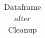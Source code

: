 \begin{table}[H]
\begin{tabular}{l|rrrr}
%
    \end{tabular}
    \caption{Dataframe after Cleanup}
    \label{tbl:Dataframe after cleanup}
\end{table}

